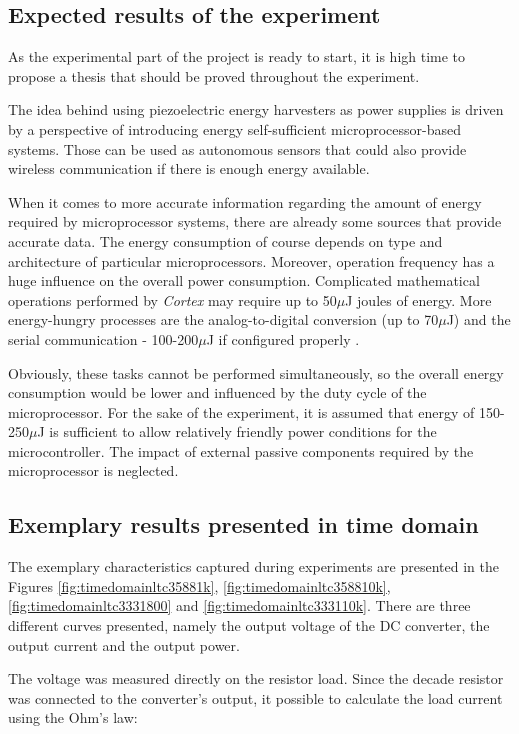 \documentclass[12pt,a4paper]{article}
\begin{document}
\subsection{Expected results of the experiment}
As the experimental part of the project is ready to start, it is high time to propose a thesis that should be proved throughout the experiment.
\par
The idea behind using piezoelectric energy harvesters as power supplies is driven by a perspective of introducing energy self-sufficient microprocessor-based systems. Those can be used as autonomous sensors that could also provide wireless communication if there is enough energy available.
\par
When it comes to more accurate information regarding the amount of energy required by microprocessor systems, there are already some sources \cite{joules} that provide accurate data. The energy consumption of course depends on type and architecture of particular microprocessors. Moreover, operation frequency has a huge influence on the overall power consumption. Complicated mathematical operations performed by \textit{Cortex} may require up to 50$\mu$J joules of energy. More energy-hungry processes are the analog-to-digital conversion (up to 70$\mu$J) and the serial communication - 100-200$\mu$J if configured properly \cite{joules}.
\par
Obviously, these tasks cannot be performed simultaneously, so the overall energy consumption would be lower and influenced by the duty cycle of the microprocessor. For the sake of the experiment, it is assumed that energy of 150-250$\mu$J is sufficient to allow relatively friendly power conditions for the microcontroller. The impact of external passive components required by the microprocessor is neglected.
\subsection{Exemplary results presented in time domain}

The exemplary characteristics captured during experiments are presented in the Figures \ref{fig:timedomainltc35881k}, \ref{fig:timedomainltc358810k}, \ref{fig:timedomainltc3331800} and \ref{fig:timedomainltc333110k}. There are three different curves presented, namely the output voltage of the DC converter, the output current and the output power.
\par

The voltage was measured directly on the resistor load. Since the decade resistor was connected to the converter's output, it possible to calculate the load current using the Ohm's law:
\end{document}
